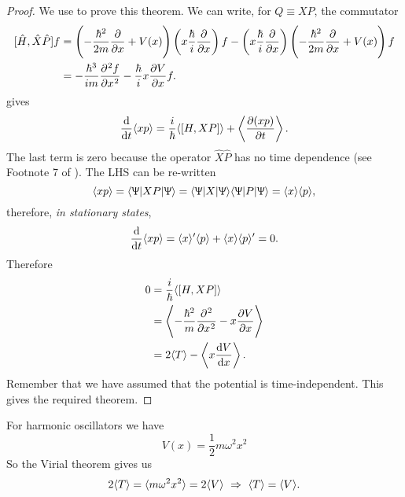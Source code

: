 \begin{proof}
We use  to prove this theorem. We can write, for $Q\equiv XP$, the commutator
\begin{subequations}
\begin{align}
[\hat{H},\hat{X}\hat{P}]f&=\lf(-\frac{\hbar^2}{2m}\diffp{}{x}+V(x) \rt)\lf(x\frac{\hbar}{i}\diffp{}{x} \rt)f-\lf(x\frac{\hbar}{i}\diffp{}{x} \rt)\lf(-\frac{\hbar^2}{2m}\diffp{}{x}+V(x) \rt)f\\
&=-\frac{\hbar^3}{im}\diffp[2]fx-\frac{\hbar}{i}x\diffp Vx f.
\end{align}
\end{subequations}
 gives 
\begin{equation}
\diff*{\lgl xp\rgl}t=\frac{i}{\hbar}\lgl [H,XP]\rgl+\lf<\diffp{(xp)}{t}\rt>.
\end{equation}
The last term is zero because the operator $\hat{X}\hat{P}$ has no time dependence (see Footnote 7 of \cite{wiki_eft}).
The LHS can be re-written
\begin{equation}
\langle xp\rangle=\langle \Uppsi|XP|\Uppsi\rangle=\langle \Uppsi|X|\Uppsi\rangle \langle \Uppsi|P|\Uppsi\rangle=\langle x\rangle \langle p\rangle,
\end{equation}
therefore, \textit{in stationary states}, 
\begin{equation}
\diff*{\lgl xp\rgl}t=\lgl x\rgl'\lgl p\rgl+\lgl x\rgl \lgl p\rgl'=0.
\end{equation}
Therefore
\begin{subequations}
\begin{align}
0&=\frac{i}{\hbar}\lgl [H,XP]\rgl\\
&=\lf<-\frac{\hbar^2}{m}\diffp[2]{}{x}-x\diffp Vx\rt>\\
&=2 \lgl T\rgl-\lf<x\diff Vx\rt>.
\end{align}
\end{subequations}
Remember that we have assumed that the potential is time-independent. This gives 
the required theorem. 
\end{proof}
\begin{coro}
For harmonic oscillators we have
\begin{equation}
V(x)=\frac{1}{2}m\omega^2x^2
\end{equation}
So the Virial theorem gives us
\begin{equation}
2 \langle T\rangle=\langle m\omega^2x^2\rangle=2 \langle V\rangle\ \Rightarrow\ \langle T\rangle=\langle V\rangle.
\end{equation}
\end{coro}
